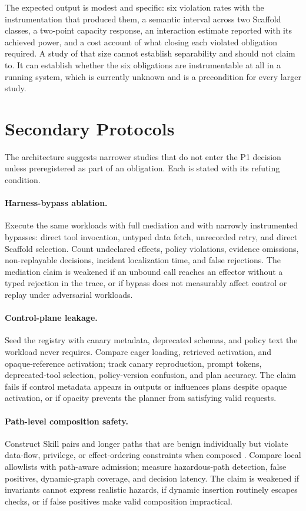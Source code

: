 \documentclass[11pt]{article}
\begin{document}
The expected output is modest and specific: six violation rates with the instrumentation that produced them, a semantic interval across two Scaffold classes, a two-point capacity response, an interaction estimate reported with its achieved power, and a cost account of what closing each violated obligation required. A study of that size cannot establish separability and should not claim to. It can establish whether the six obligations are instrumentable at all in a running system, which is currently unknown and is a precondition for every larger study.

\section{Secondary Protocols}
\label{sec:secondary}

The architecture suggests narrower studies that do not enter the P1 decision unless preregistered as part of an obligation. Each is stated with its refuting condition.

\paragraph{Harness-bypass ablation.}
Execute the same workloads with full mediation and with narrowly instrumented bypasses: direct tool invocation, untyped data fetch, unrecorded retry, and direct Scaffold selection. Count undeclared effects, policy violations, evidence omissions, non-replayable decisions, incident localization time, and false rejections. The mediation claim is weakened if an unbound call reaches an effector without a typed rejection in the trace, or if bypass does not measurably affect control or replay under adversarial workloads.

\paragraph{Control-plane leakage.}
Seed the registry with canary metadata, deprecated schemas, and policy text the workload never requires. Compare eager loading, retrieved activation, and opaque-reference activation; track canary reproduction, prompt tokens, deprecated-tool selection, policy-version confusion, and plan accuracy. The claim fails if control metadata appears in outputs or influences plans despite opaque activation, or if opacity prevents the planner from satisfying valid requests.

\paragraph{Path-level composition safety.}
Construct Skill pairs and longer paths that are benign individually but violate data-flow, privilege, or effect-ordering constraints when composed \cite{xie2026composition}. Compare local allowlists with path-aware admission; measure hazardous-path detection, false positives, dynamic-graph coverage, and decision latency. The claim is weakened if invariants cannot express realistic hazards, if dynamic insertion routinely escapes checks, or if false positives make valid composition impractical.
\end{document}
